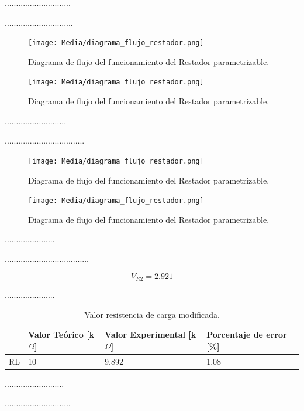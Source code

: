 \documentclass[journal]{IEEEtran}
\begin{document}
\par .............................
\par .............................. 
\begin{figure}[H]
    \centering
    \texttt{[image: Media/diagrama\_flujo\_restador.png]}
    \caption{Diagrama de flujo del funcionamiento del Restador parametrizable.}
    \label{fig:diagrama_flujo_restador}
\end{figure}
\begin{figure}[H]
    \centering
    \texttt{[image: Media/diagrama\_flujo\_restador.png]}
    \caption{Diagrama de flujo del funcionamiento del Restador parametrizable.}
    \label{fig:diagrama_flujo_restador}
\end{figure}

\par ...........................
\par ...................................
\begin{figure}[H]
    \centering
    \texttt{[image: Media/diagrama\_flujo\_restador.png]}
    \caption{Diagrama de flujo del funcionamiento del Restador parametrizable.}
    \label{fig:diagrama_flujo_restador}
\end{figure}
\begin{figure}[H]
    \centering
    \texttt{[image: Media/diagrama\_flujo\_restador.png]}
    \caption{Diagrama de flujo del funcionamiento del Restador parametrizable.}
    \label{fig:diagrama_flujo_restador}
\end{figure}
\par ......................
\par .....................................

\begin{equation*}
    V_{R2}=2.921
\end{equation*}

\par ......................

\begin{table}[h]
\caption{Valor resistencia de carga modificada.}
    \centering
    \renewcommand{\arraystretch}{1.2} %
    \begin{tabular}{|l|p{2cm}|p{2cm}|p{2cm}|}
        \hline
        & \textbf{Valor Teórico [k$\Omega$]} & \textbf{Valor Experimental [k$\Omega$]} & \textbf{Porcentaje de error [\%]} \\
        \hline
        RL & 10  & 9.892  & 1.08 \\
        \hline
    \end{tabular}
    
    \label{tab:resistencia_carga}
\end{table}
\par ..........................
\par .............................
\end{document}
